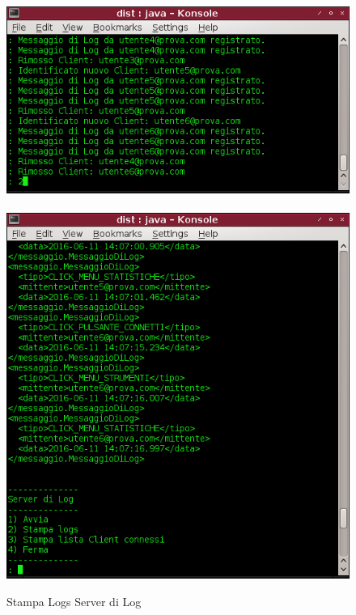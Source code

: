 \documentclass[a4paper, 11pt]{article} %
\begin{document}
\begin{center}
\begin{figure}[H]
\vspace{-2.0cm}
\includegraphics[width=1.0\textwidth]{images/server_di_log-5.png}
\\
\\
\includegraphics[width=1.0\textwidth]{images/server_di_log-6.png}
\vspace{-0.6cm}
\caption{Stampa Logs Server di Log}
\end{figure}
\end{center}
\vspace{-1.0cm}
\end{document}
